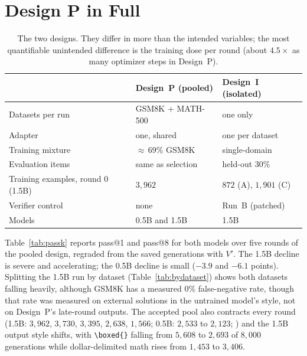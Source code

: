 \documentclass[runningheads]{llncs}
\begin{document}
\section{Design P in Full}
\label{app:pooled}

\begin{table}[t]
\caption{The two designs. They differ in more than the intended variables;
the most quantifiable unintended difference is the training dose per round
(about $4.5\times$ as many optimizer steps in Design~P).}
\label{tab:designs}
\centering
\begin{tabular}{lll}
\toprule
& Design~P (pooled) & Design~I (isolated) \\
\midrule
Datasets per run & GSM8K + MATH-500 & one only \\
Adapter & one, shared & one per dataset \\
Training mixture & $\approx$\,69\% GSM8K & single-domain \\
Evaluation items & same as selection & held-out 30\% \\
Training examples, round 0 (1.5B) & $3{,}962$ & $872$ (A), $1{,}901$ (C) \\
Verifier control & none & Run~B (patched) \\
Models & 0.5B and 1.5B & 1.5B \\
\bottomrule
\end{tabular}
\end{table}

Table~\ref{tab:passk} reports pass@1 and pass@8 for both models over five rounds
of the pooled design, regraded from the saved generations with $V'$. The
1.5B decline is severe and accelerating; the 0.5B decline is small ($-3.9$ and
$-6.1$ points). Splitting the 1.5B run by dataset (Table~\ref{tab:bydataset})
shows both datasets falling heavily, although GSM8K has a measured $0\%$
false-negative rate, though that rate was measured on external solutions in
the untrained model's style, not on Design~P's late-round outputs. The accepted
pool also contracts every round (1.5B: $3{,}962$, $3{,}730$, $3{,}395$,
$2{,}638$, $1{,}566$; 0.5B: $2{,}533$ to $2{,}123$;
) and the 1.5B output style shifts, with
\verb|\boxed{}| falling from $5{,}608$ to $2{,}693$ of $8{,}000$ generations while
dollar-delimited math rises from $1{,}453$ to $3{,}406$.
\end{document}
